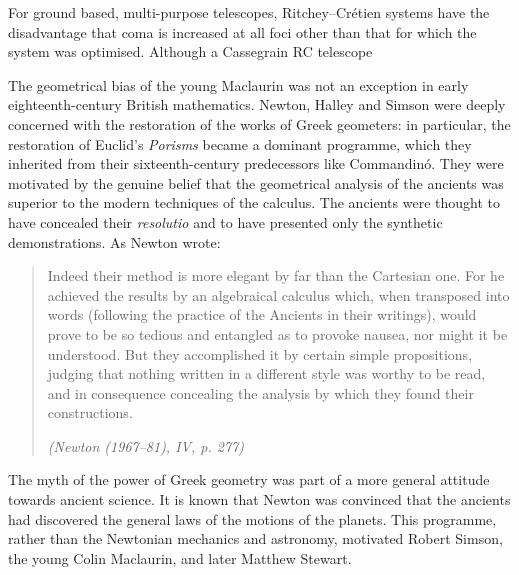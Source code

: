 For ground based, multi-purpose telescopes, Ritchey--Cr\'etien
systems have the disadvantage that coma is increased at all foci other
than that for which the system was optimised. Although a Cassegrain
RC telescope

The geometrical bias of the young Maclaurin was not an
exception in early eighteenth-century British mathematics. Newton,
Halley and Simson were deeply concerned with the restoration of the
works of Greek geometers: in particular, the restoration of
Euclid's {\it Porisms\/} became a dominant programme, which they
inherited from their sixteenth-century predecessors like Commandin\'o.
They were motivated by the genuine belief that the geometrical analysis
of the ancients was superior to the modern techniques of the calculus.
The ancients were thought to have concealed their {\it resolutio\/}
and to have presented only the synthetic demonstrations. As
Newton wrote:
\begin{quote}
Indeed their method is more elegant by far than the Cartesian
one. For he achieved the results by an algebraical calculus which,
when transposed into words (following the practice of the Ancients in
their writings), would prove to be so tedious and entangled as to
provoke nausea, nor might it be understood. But they accomplished it
by certain simple propositions, judging that nothing written in a
different style was worthy to be read, and in consequence concealing
the analysis by which they found their constructions.
\begin{flushright}
{\it (Newton (1967--81), IV, p. 277)}
\end{flushright}
\end{quote}
The myth of the power of Greek geometry was part of a more
general attitude towards ancient science. It is known that Newton was
convinced that the ancients had discovered the general laws of the
motions of the planets. This programme, rather than the Newtonian
mechanics and astronomy, motivated Robert Simson, the young Colin
Maclaurin, and later Matthew Stewart.

